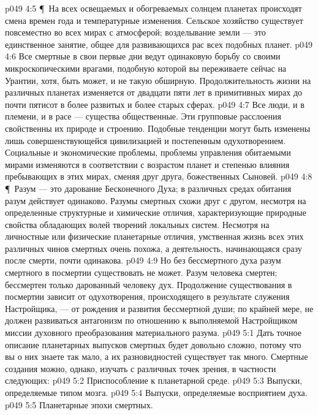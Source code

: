 \vs p049 4:5 \P\ На всех освещаемых и обогреваемых солнцем планетах происходят смена времен года и температурные изменения. Сельское хозяйство существует повсеместно во всех мирах с атмосферой; возделывание земли --- это единственное занятие, общее для развивающихся рас всех подобных планет.
\vs p049 4:6 Все смертные в свои первые дни ведут одинаковую борьбу со своими микроскопическими врагами, подобную которой вы переживаете сейчас на Урантии, хотя, быть может, и не такую обширную. Продолжительность жизни на различных планетах изменяется от двадцати пяти лет в примитивных мирах до почти пятисот в более развитых и более старых сферах.
\vs p049 4:7 Все люди, и в племени, и в расе --- существа общественные. Эти групповые расслоения свойственны их природе и строению. Подобные тенденции могут быть изменены лишь совершенствующейся цивилизацией и постепенным одухотворением. Социальные и экономические проблемы, проблемы управления обитаемыми мирами изменяются в соответствии с возрастом планет и степенью влияния пребывающих в этих мирах, сменяя друг друга, божественных Сыновей.
\vs p049 4:8 \P\ Разум --- это дарование Бесконечного Духа; в различных средах обитания разум действует одинаково. Разумы смертных схожи друг с другом, несмотря на определенные структурные и химические отличия, характеризующие природные свойства обладающих волей творений локальных систем. Несмотря на личностные или физические планетарные отличия, умственная жизнь всех этих различных чинов смертных очень похожа, а деятельность, начинающаяся сразу после смерти, почти одинакова.
\vs p049 4:9 Но без бессмертного духа разум смертного в посмертии существовать не может. Разум человека смертен; бессмертен только дарованный человеку дух. Продолжение существования в посмертии зависит от одухотворения, происходящего в результате служения Настройщика, --- от рождения и развития бессмертной души; по крайней мере, не должен развиваться антагонизм по отношению к выполняемой Настройщиком миссии духовного преобразования материального разума.
\vs p049 5:1 Дать точное описание планетарных выпусков смертных будет довольно сложно, потому что вы о них знаете так мало, а их разновидностей существует так много. Смертные создания можно, однако, изучать с различных точек зрения, в частности следующих:
\vs p049 5:2 \bibnobreakspace Приспособление к планетарной среде.
\vs p049 5:3 \bibnobreakspace Выпуски, определяемые типом мозга.
\vs p049 5:4 \bibnobreakspace Выпуски, определяемые восприятием духа.
\vs p049 5:5 \bibnobreakspace Планетарные эпохи смертных.
